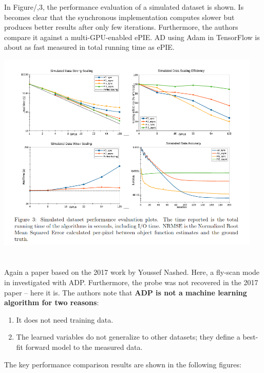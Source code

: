 \documentclass{article}
\newcommand{\newcite}[1] {\section{\cite{#1} \citenum{#1}}}
\begin{document}
In Figure/,3, the performance evaluation of a simulated dataset is shown. Is becomes clear that the synchronous implementation computes slower but produces better results after only few iterations. Furthermore, the authors compare it against a multi-GPU-enabled ePIE. AD using Adam in TensorFlow is about as fast measured in total running time as ePIE. 

\begin{center}
    \includegraphics[width=0.95\textwidth]{figures/nashed_performance.png}
\end{center}


\newcite{Ghosh2018-jf}
Again a paper based on the 2017 work by Youssef Nashed. Here, a fly-scan mode in investigated with ADP. Furthermore, the probe was not recovered in the 2017 paper – here it is.
The authors note that \textbf{ADP is not a machine learning algorithm for two reasons}:
\begin{enumerate}
    \item It does not need training data.
    \item The learned variables do not generalize to other datasets; they define a best-fit forward model to the measured data.
\end{enumerate}

The key performance comparison results are shown in the following figures:
\end{document}
